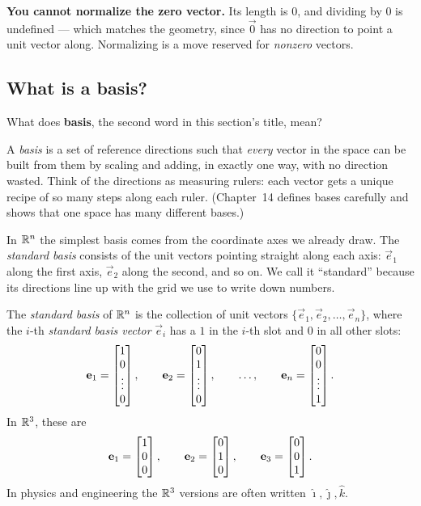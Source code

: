\begin{trapbox}
\textbf{You cannot normalize the zero vector.} Its length is $0$, and dividing by $0$ is
undefined --- which matches the geometry, since $\vec{0}$ has no direction to point a unit
vector along. Normalizing is a move reserved for \emph{nonzero} vectors.
\end{trapbox}

\subsection*{What is a basis?}

What does \textbf{basis}, the second word in this section's title, mean?

A \emph{basis} is a set of reference directions such that \emph{every} vector in the
space can be built from them by scaling and adding, in exactly one way, with no direction
wasted. Think of the directions as measuring rulers: each vector gets a unique recipe of
so many steps along each ruler. (Chapter~14 defines bases carefully and shows that one
space has many different bases.)

In $\mathbb{R}^n$ the simplest basis comes from the coordinate axes we already draw. The
\emph{standard basis} consists of the unit vectors pointing straight along each axis:
$\vec{e}_1$ along the first axis, $\vec{e}_2$ along the second, and so on. We call it
``standard'' because its directions line up with the grid we use to write down numbers.

\begin{formalbox}
\begin{definition}
\label{ch02:def-ei}
The \emph{standard basis} of $\mathbb{R}^n$ is the collection of unit vectors
$\{\vec{e}_1, \vec{e}_2, \dots, \vec{e}_n\}$, where the $i$-th \emph{standard basis vector}
$\vec{e}_i$ has a $1$ in the $i$-th slot and $0$ in all other slots:
\[
  \mathbf{e}_1 = \begin{bmatrix}1\\0\\ \vdots \\0\end{bmatrix},\qquad
  \mathbf{e}_2 = \begin{bmatrix}0\\1\\ \vdots \\0\end{bmatrix},\qquad
  \dots,\qquad
  \mathbf{e}_n = \begin{bmatrix}0\\0\\ \vdots \\1\end{bmatrix}.
\]
In $\mathbb{R}^3$, these are
\[
  \mathbf{e}_1 = \begin{bmatrix}1\\0\\0\end{bmatrix},\qquad
  \mathbf{e}_2 = \begin{bmatrix}0\\1\\0\end{bmatrix},\qquad
  \mathbf{e}_3 = \begin{bmatrix}0\\0\\1\end{bmatrix}.
\]
In physics and engineering the $\mathbb{R}^3$ versions are often written
$\hat{\imath},\hat{\jmath},\hat{k}$.
\end{definition}
\end{formalbox}


